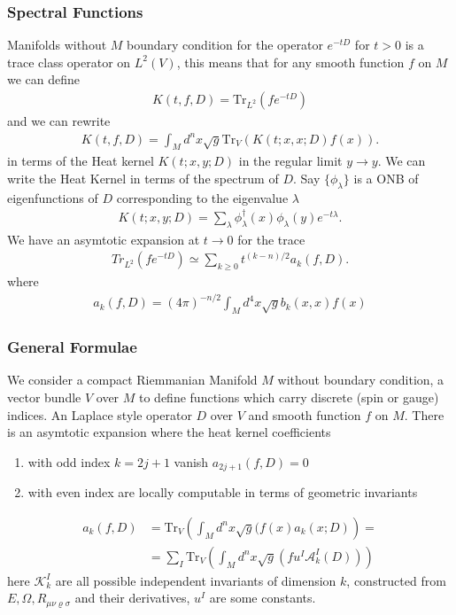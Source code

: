 \subsubsection{Spectral Functions}
Manifolds without $M$ boundary condition for the operator $e^{-tD}$ for $t>0$ is a
trace class operator on $L^2(V)$, this means that for any smooth function $f$
on $M$ we can define
\begin{align}
    K(t,f,D) = \text{Tr}_{L^2}(fe^{-tD})
\end{align}
and we can rewrite
\begin{align}
    K(t, f, D) = \int_M d^n x \sqrt{g} \text{Tr}_V(K(t;x,x;D)f(x)).
\end{align}
in terms of the Heat kernel $K(t;x,y;D)$ in the regular limit $y\rightarrow y$.
We can write the Heat Kernel in terms of the spectrum of $D$. Say
$\{\phi_\lambda\}$ is a ONB of eigenfunctions of $D$ corresponding to the
eigenvalue $\lambda$
\begin{align}
    K(t;x,y;D) = \sum_\lambda \phi^\dagger_\lambda(x)
    \phi_\lambda(y)e^{-t\lambda}.
\end{align}
We have an asymtotic expansion at $t \rightarrow 0$  for the trace
\begin{align}
    Tr_{L^2}(fe^{-tD}) \simeq \sum_{k\geq 0}t^{(k-n)/2}a_k(f,D).
\end{align}
where
\begin{align}
    a_k(f,D) = (4\pi)^{-n/2} \int_M d^4x \sqrt{g} b_k(x,x) f(x)
\end{align}
\subsubsection{General Formulae}
We consider a compact Riemmanian Manifold $M$ without boundary condition, a
vector bundle $V$ over $M$ to define functions which carry discrete (spin or
gauge) indices. An Laplace style operator $D$ over $V$ and smooth function $f$
on $M$. There is an asymtotic expansion where the heat kernel coefficients
\begin{enumerate}
    \item with odd index $k=2j+1$ vanish
        $a_{2j+1}(f,D) = 0$
    \item with even index are locally computable in terms of geometric
        invariants
\end{enumerate}
\begin{align}
    a_k(f,D) &= \text{Tr}_V\left(\int_M d^n x\sqrt{g}(f(x)a_k(x;D)\right) =\\
    &=\sum_I \text{Tr}_V\left(\int_M d^nx \sqrt{g}(fu^I \mathcal{A}^I_k(D))\right)
\end{align}
here $\mathcal{K}^I_k$ are all possible independent invariants of dimension
$k$, constructed from $E, \Omega, R_{\mu\nu\varrho\sigma}$ and their
derivatives, $u^I$ are some constants.

